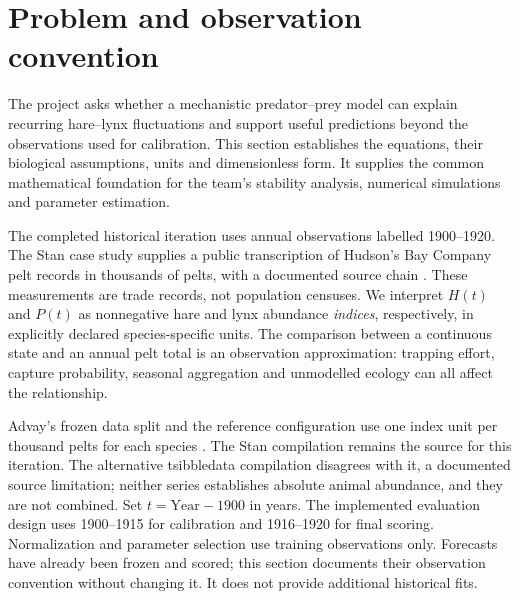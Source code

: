 \section{Problem and observation convention}
The project asks whether a mechanistic predator--prey model can explain recurring
hare--lynx fluctuations and support useful predictions beyond the observations used
for calibration. This section establishes the equations, their biological assumptions,
units and dimensionless form. It supplies the common mathematical foundation for the
team's stability analysis, numerical simulations and parameter estimation.

The completed historical iteration uses annual observations labelled 1900--1920.
The Stan case study supplies a public transcription of Hudson's Bay Company pelt
records in thousands of pelts, with a documented source chain
\cite{arnav_carpenter2018}. These measurements are trade records, not population
censuses. We interpret $H(t)$ and $P(t)$ as nonnegative hare and lynx abundance
\emph{indices}, respectively, in explicitly declared species-specific units.
The comparison between a continuous state and an annual pelt total is an observation
approximation: trapping effort, capture probability, seasonal aggregation and
unmodelled ecology can all affect the relationship.

Advay's frozen data split and the reference configuration use one index unit per
thousand pelts for each species \cite{arnav_advay2026,arnav_historical2026}.
The Stan compilation remains the source for this iteration. The alternative
tsibbledata compilation disagrees with it, a documented source limitation; neither
series establishes absolute animal abundance, and they are not combined.
Set $t=\mathrm{Year}-1900$ in years. The implemented evaluation design uses
1900--1915 for calibration and 1916--1920 for final scoring. Normalization and
parameter selection use training observations only. Forecasts have already been
frozen and scored; this section documents their observation convention without
changing it. It does not provide additional historical fits.

